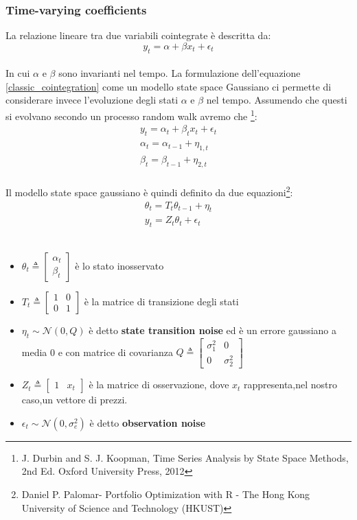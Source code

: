 \documentclass[]{article}
\begin{document}
\subsubsection{Time-varying coefficients}
La relazione lineare tra due variabili cointegrate è descritta da:
\begin{equation}\label{classic_cointegration}
	y_t = \alpha + \beta x_t + \epsilon_t
\end{equation}
\\
In cui $\alpha$ e $\beta$ sono invarianti nel tempo.
La formulazione dell'equazione \ref{classic_cointegration} come un modello state space Gaussiano ci permette di considerare invece l'evoluzione degli stati $\alpha$ e $\beta$ nel tempo. Assumendo che questi si evolvano secondo un processo random walk avremo che \footnote{J. Durbin and S. J. Koopman, Time Series Analysis by State Space Methods, 2nd Ed. Oxford University Press, 2012}:
\begin{align}
	y_t = \alpha_t + \beta_t x_t + \epsilon_t\\
	\alpha_t = \alpha_{t-1} + \eta_{1,t}\\        
	\beta_t = \beta_{t-1} + \eta_{2,t}
\end{align}
\\
Il modello state space gaussiano è quindi definito da due equazioni\footnote{Daniel P. Palomar- Portfolio Optimization with R - The Hong Kong University of Science and Technology (HKUST)}:
\begin{align}
		\theta_{t}=T_t\theta_{t-1} + \eta_t\\   
		y_t = Z_t\theta_t + \epsilon_t 
\end{align}
\
\begin{itemize}
	\item $\theta_t \triangleq \begin{bmatrix}
		\alpha_t\\
		\beta_t
	\end{bmatrix}$ è lo stato inosservato
	
	\item $T_t \triangleq \begin{bmatrix}
		1 & 0 \\
		0 & 1
	\end{bmatrix}$ è la matrice di transizione degli stati
	
	\item $\eta_t \sim \mathcal{N}(0,Q)$ è detto \textbf{state transition noise} ed è un errore gaussiano a media 0 e con matrice di covarianza $Q \triangleq \begin{bmatrix}
		\sigma^2_1 & 0 \\
		0 & 	\sigma^2_2
	\end{bmatrix}$
	
	\item $Z_t \triangleq  \begin{bmatrix}
		1 & x_t
	\end{bmatrix}$ è la matrice di osservazione, dove $x_t$ rappresenta,nel nostro caso,un vettore di prezzi.
	
	\item $\epsilon_t \sim \mathcal{N}(0,\sigma^2_e)$ è detto \textbf{observation noise} 
\end{itemize}
\end{document}
